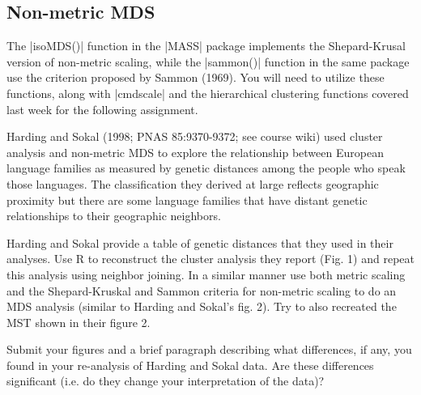 



\subsection*{Non-metric MDS}

The |isoMDS()| function in the |MASS| package implements the Shepard-Krusal version of non-metric scaling, while the |sammon()| function in the same package use the criterion proposed by Sammon (1969). You will need to utilize these functions, along with |cmdscale| and the hierarchical clustering functions covered last week for the following assignment.

\medskip
\begin{assignment}
Harding and Sokal (1998; PNAS 85:9370-9372; see course wiki) used cluster analysis and non-metric MDS to explore the relationship between European language families as measured by genetic distances among the people who speak those languages.  The classification they derived at large reflects geographic proximity but there are some language families that have distant genetic relationships to their geographic neighbors.

\medskip
Harding and Sokal provide a table of genetic distances that they used in their analyses. Use R to reconstruct the cluster analysis they report (Fig. 1) and repeat this analysis using neighbor joining. In a similar manner use both metric scaling and the Shepard-Kruskal and Sammon criteria for non-metric scaling to do an MDS analysis (similar to Harding and Sokal's fig. 2).  Try to also recreated the MST shown in their figure 2.

\medskip
Submit your figures and a brief paragraph describing what differences, if any, you found in your re-analysis of Harding and Sokal data. Are these differences significant (i.e. do they change your interpretation of the data)?

\end{assignment}



